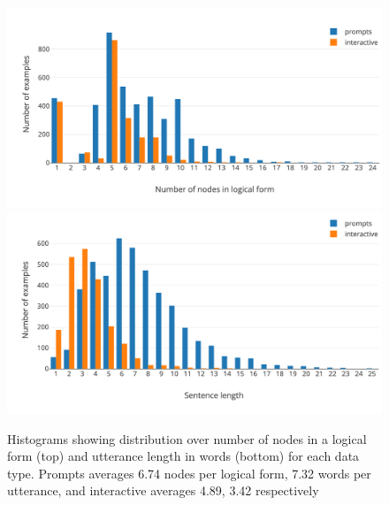 \begin{figure}
\center
\hspace*{-.2cm}\includegraphics[width=1\linewidth, height=0.35\linewidth]{figures/nodenum_histogram}
\hspace*{-.2cm}\includegraphics[width=1\linewidth, height=0.35\linewidth]{figures/sentence_length_histogram}
\caption{Histograms showing distribution over number of nodes in a logical form (top) and utterance length in words (bottom) for each data type. Prompts averages 6.74 nodes per logical form, 7.32 words per utterance, and interactive averages 4.89, 3.42 respectively}
\label{fig:quant_sent_len}
\end{figure}



